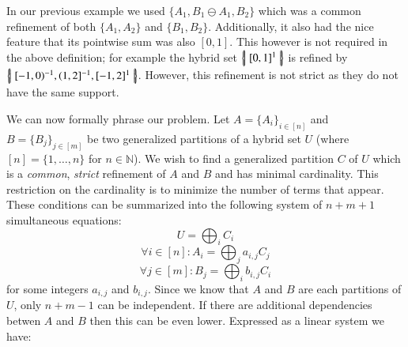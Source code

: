 In our previous example we used $\{ A_1, B_1 \ominus A_1, B_2 \}$ which was a common refinement of both
$\{ A_1, A_2 \}$ and $\{ B_1, B_2 \}$.
Additionally, it also had the nice feature that its pointwise sum was also $[0,1]$.
This however is not required in the above definition; for example the hybrid set $\left\{ \! \left| \; [0,1]^1 \; \right| \! \right\}$ is refined by
$\left\{ \! \left| \;  [-1,0)^{-1}, (1,2]^{-1}, [-1,2]^1  \; \right| \! \right\}$.
However, this refinement is not strict as they do not have the same support.


We can now formally phrase our problem.
Let $A=\{ A_i \}_{i \in [n]}$ and $B=\{ B_j \}_{j \in [m]}$ be two generalized partitions of a hybrid set $U$ 
(where $[n] = \{ 1, \ldots, n \}$ for $n \in \mathbb{N}$).
We wish to find a generalized partition $C$  of $U$ which is a \emph{common}, \emph{strict} refinement of $A$ and $B$
and has minimal cardinality.
This restriction on the cardinality is to minimize the number of terms that appear.
These conditions can be summarized into the following system of $n+m+1$ simultaneous equations:
\begin{equation}
	U = \bigoplus_i C_i
\end{equation}
\begin{equation}
	\forall i \in [n] : A_i = \bigoplus_j  a_{i,j} C_j
\end{equation}
\begin{equation}
	\forall j \in [m] : B_j = \bigoplus_i b_{i,j} C_i
\end{equation}
for some integers $a_{i,j}$ and $b_{i,j}$.
Since we know that $A$ and $B$ are each partitions of $U$, only $n+m-1$ can be independent.
If there are additional dependencies betwen $A$ and $B$ then this can be even lower.
Expressed as a linear system we have:


